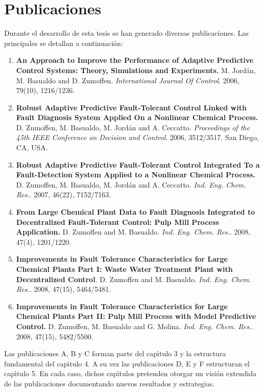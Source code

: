 \chapter*{Publicaciones}
Durante el desarrollo de esta tesis se han generado diversas publicaciones. Las principales se detallan a continuaci{\'o}n:
\begin{enumerate}
\small
    \item[A-] \textbf{An Approach to Improve the Performance of Adaptive Predictive Control Systems: Theory,  Simulations and Experiments.} M.
        Jord{\'a}n, M. Basualdo and D. Zumoffen. \textit{International Journal
    Of Control}. 2006, 79(10), 1216/1236.
    \item[B-] \textbf{Robust Adaptive Predictive Fault-Tolerant Control Linked with Fault Diagnosis System Applied On a Nonlinear Chemical Process.} D.
        Zumoffen, M. Basualdo, M. Jord{\'a}n and A. Ceccatto.
    \textit{Proceedings of the 45th IEEE Conference on Decision and Control}. 2006, 3512/3517. San Diego,
    CA, USA.
    \item[C-] \textbf{Robust Adaptive Predictive Fault-Tolerant Control Integrated To a Fault-Detection System Applied to a Nonlinear Chemical
        Process.} D. Zumoffen, M. Basualdo, M. Jord{\'a}n and A.
    Ceccatto. \textit{Ind. Eng.
    Chem. Res.}. 2007, 46(22), 7152/7163.
    \item[D-] \textbf{From Large Chemical Plant Data to Fault Diagnosis Integrated to Decentralized Fault-Tolerant Control: Pulp Mill Process
        Application.} D. Zumoffen and M. Basualdo. \textit{Ind. Eng.
    Chem. Res.}. 2008, 47(4), 1201/1220.
    \item[E-] \textbf{Improvements in Fault Tolerance Characteristics for Large Chemical Plants Part I: Waste Water Treatment Plant with Decentralized
        Control}. D. Zumoffen and M. Basualdo. \textit{Ind. Eng. Chem. Res.}. 2008, 47(15), 5464/5481.
    \item[F-] \textbf{Improvements in Fault Tolerance Characteristics for Large Chemical Plants Part II: Pulp Mill Process with Model Predictive Control.} D.
        Zumoffen, M. Basualdo and G. Molina. \textit{Ind. Eng. Chem. Res.}. 2008, 47(15), 5482/5500.
\end{enumerate}
\normalsize

Las publicaciones A, B y C forman parte del cap{\'\i}tulo 3 y la estructura fundamental del cap{\'\i}tulo 4. A su vez las publicaciones D, E y F estructuran el
cap{\'\i}tulo 5. En cada caso, dichos cap{\'\i}tulos pretenden otorgar un visi{\'o}n extendida de las publicaciones documentando nuevos resultados y estrategias.


